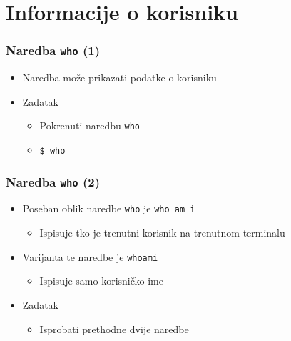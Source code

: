 \documentclass{beamer}
\newcommand{\shell}[1]{\texttt{#1}}
\begin{document}
\section{Informacije o korisniku}
\begin{frame}[t]
\frametitle{Naredba \shell{who} (1)}
\begin{itemize}
  \item Naredba može prikazati podatke o korisniku
  \item Zadatak
  \begin{itemize}
    \item Pokrenuti naredbu \shell{who}
    \item[] \shell{\$ who}
    \begin{table}[h]
    \end{table}
  \end{itemize}
\end{itemize}
\end{frame}

\begin{frame}[t]
\frametitle{Naredba \shell{who} (2)}
\begin{itemize}
  \item Poseban oblik naredbe \shell{who} je \shell{who am i}
  \begin{itemize}
    \item Ispisuje tko je trenutni korisnik na trenutnom terminalu
  \end{itemize}
  \item Varijanta te naredbe je \shell{whoami}
  \begin{itemize}
    \item Ispisuje samo korisničko ime
  \end{itemize}
  \item Zadatak
  \begin{itemize}
    \item Isprobati prethodne dvije naredbe
  \end{itemize}
\end{itemize}
\end{frame}
\end{document}
